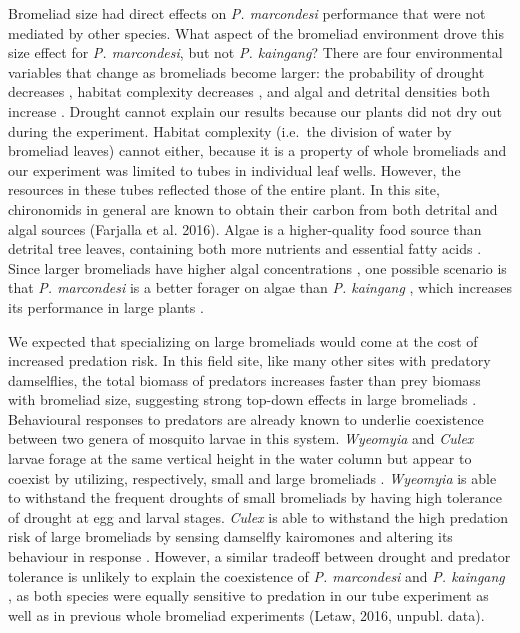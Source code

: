 Bromeliad size had direct effects on \emph{P. marcondesi} performance
that were not mediated by other species. What aspect of the bromeliad
environment drove this size effect for \emph{P. marcondesi}, but not
\emph{P. kaingang}? There are four environmental variables that change
as bromeliads become larger: the probability of drought decreases
\citep{Amundrud2015}, habitat complexity decreases
\citep{Srivastava2006a}, and algal and detrital densities both increase
\citep{Richardson1999, Marino2011}. Drought cannot explain our results
because our plants did not dry out during the experiment. Habitat
complexity (i.e.~the division of water by bromeliad leaves) cannot
either, because it is a property of whole bromeliads and our experiment
was limited to tubes in individual leaf wells. However, the resources in
these tubes reflected those of the entire plant. In this site,
chironomids in general are known to obtain their carbon from both
detrital and algal sources (Farjalla et al. 2016). Algae is a
higher-quality food source than detrital tree leaves, containing both
more nutrients and essential fatty acids \citep{Torres-Ruiz2007}. Since
larger bromeliads have higher algal concentrations \citep{Marino2011},
one possible scenario is that \emph{P. marcondesi} is a better forager
on algae than \emph{P. kaingang} , which increases its performance in
large plants .

We expected that specializing on large bromeliads would come at the cost
of increased predation risk. In this field site, like many other sites
with predatory damselflies, the total biomass of predators increases
faster than prey biomass with bromeliad size, suggesting strong top-down
effects in large bromeliads \citep{Petermann2015a}. Behavioural
responses to predators are already known to underlie coexistence between
two genera of mosquito larvae in this system. \emph{Wyeomyia} and
\emph{Culex} larvae forage at the same vertical height in the water
column but appear to coexist by utilizing, respectively, small and large
bromeliads \citep{Gilbert2008}. \emph{Wyeomyia} is able to withstand the
frequent droughts of small bromeliads by having high tolerance of
drought at egg \citep{Dezerald2015} and larval \citep{Amundrud2015}
stages. \emph{Culex} is able to withstand the high predation risk of
large bromeliads by sensing damselfly kairomones and altering its
behaviour in response \citep{Hammill2015}. However, a similar tradeoff
between drought and predator tolerance is unlikely to explain the
coexistence of \emph{P. marcondesi} and \emph{P. kaingang} , as both
species were equally sensitive to predation in our tube experiment as
well as in previous whole bromeliad experiments (Letaw, 2016, unpubl.
data).

